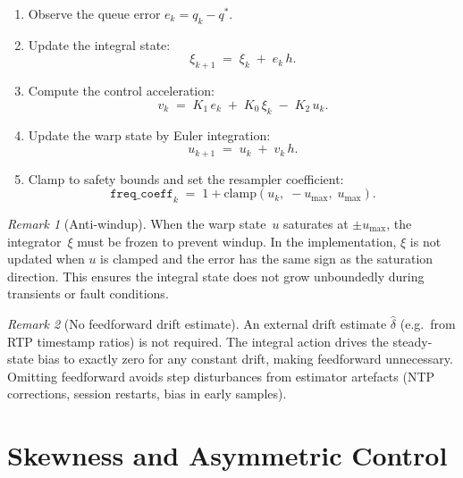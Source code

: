 \documentclass[11pt, a4paper]{article}
\theoremstyle{definition}
\theoremstyle{plain}
\theoremstyle{remark}
\newtheorem{remark}{Remark}[section]
\begin{document}
\begin{enumerate}
  \item Observe the queue error $e_k = q_k - q^*$.
  \item Update the integral state:
    \begin{equation}\label{eq:impl-xi}
      \xi_{k+1} \;=\; \xi_k \;+\; e_k\,h.
    \end{equation}
  \item Compute the control acceleration:
    \begin{equation}\label{eq:impl-v}
      v_k \;=\; K_1\,e_k \;+\; K_0\,\xi_k \;-\; K_2\,u_k.
    \end{equation}
  \item Update the warp state by Euler integration:
    \begin{equation}\label{eq:impl-u}
      u_{k+1} \;=\; u_k \;+\; v_k\,h.
    \end{equation}
  \item Clamp to safety bounds and set the resampler coefficient:
    \begin{equation}\label{eq:impl-coeff}
      \texttt{freq\_coeff}_k \;=\; 1 + \text{clamp}(u_k,\;
        -u_{\max},\; u_{\max}).
    \end{equation}
\end{enumerate}

\begin{remark}[Anti-windup]
  When the warp state~$u$ saturates at $\pm u_{\max}$, the
  integrator~$\xi$ must be frozen to prevent windup.  In the
  implementation, $\xi$ is not updated when $u$ is clamped and the
  error has the same sign as the saturation direction.  This
  ensures the integral state does not grow unboundedly during
  transients or fault conditions.
\end{remark}

\begin{remark}[No feedforward drift estimate]
  An external drift estimate $\hat{\delta}$ (e.g.\ from RTP timestamp
  ratios) is not required.  The integral action drives the
  steady-state bias to exactly zero for any constant drift, making
  feedforward unnecessary.  Omitting feedforward avoids step
  disturbances from estimator artefacts (NTP corrections, session
  restarts, bias in early samples).
\end{remark}

\section{Skewness and Asymmetric Control}%
\label{sec:skewness}
\end{document}
